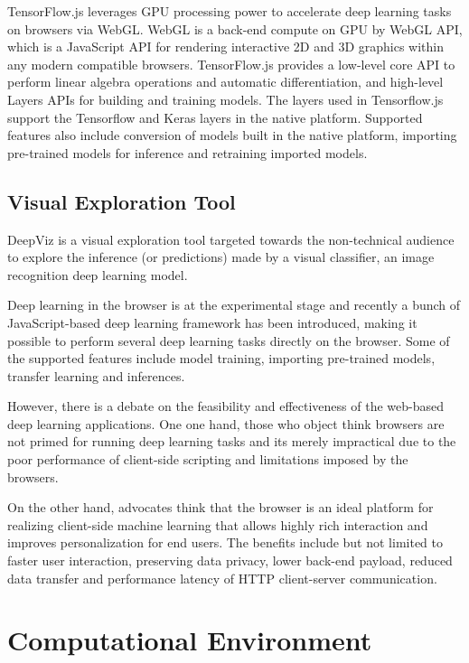 TensorFlow.js leverages GPU processing power to accelerate deep learning tasks on browsers via WebGL. WebGL is a back-end compute on GPU by WebGL API, which is a JavaScript API for rendering interactive 2D and 3D graphics within any modern compatible browsers. TensorFlow.js provides a low-level core API to perform linear algebra operations and automatic differentiation, and high-level Layers APIs for building and training models. The layers used in Tensorflow.js support the Tensorflow and Keras layers in the native platform. Supported features also include conversion of models built in the native platform, importing pre-trained models for inference and retraining imported models.

\subsection{Visual Exploration Tool}

DeepViz is a visual exploration tool targeted towards the non-technical audience to explore the inference (or predictions) made by a visual classifier, an image recognition deep learning model.

Deep learning in the browser is at the experimental stage and recently a bunch of JavaScript-based deep learning framework has been introduced, making it possible to perform several deep learning tasks directly on the browser. Some of the supported features include model training, importing pre-trained models, transfer learning and inferences.

However, there is a debate on the feasibility and effectiveness of the web-based deep learning applications. One one hand, those who object think browsers are not primed for running deep learning tasks and its merely impractical due to the poor performance of client-side scripting and limitations imposed by the browsers. 

On the other hand, advocates think that the browser is an ideal platform for realizing client-side machine learning that allows highly rich interaction and improves personalization for end users. The benefits include but not limited to faster user interaction, preserving data privacy, lower back-end payload, reduced data transfer and performance latency of HTTP client-server communication.

\section{Computational Environment}

